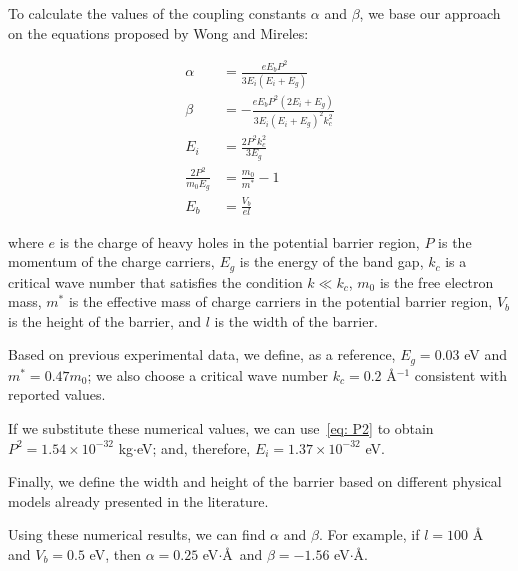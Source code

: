 To calculate the values of the coupling constants $\alpha$ and $\beta$, we base our approach on the equations proposed by Wong and Mireles\cite{WongUNAM2005}:

\begin{align}
    \alpha &= \frac{eE_b P^2}{3E_i\left( E_i + E_g \right)}\label{eq: alfa}\\
    \beta &= -\frac{eE_b P^2\left( 2E_i + E_g \right)}{3E_i\left( E_i + E_g \right)^2 k_c^2}\label{eq: beta}\\
    E_i &= \frac{2P^2 k_c^2}{3E_g} \label{eq: E_i}\\
    \frac{2P^2}{m_0 E_g} &= \frac{m_0}{m^*} - 1 \label{eq: P2}\\
    E_b &= \frac{V_b}{el} \label{eq: E_b}
\end{align}

\noindent where $e$ is the charge of heavy holes in the potential barrier region, $P$ is the momentum of the charge carriers, $E_g$ is the energy of the band gap, $k_c$ is a critical wave number that satisfies the condition $k \ll k_c$, $m_0$ is the free electron mass, $m^*$ is the effective mass of charge carriers in the potential barrier region, $V_b$ is the height of the barrier, and $l$ is the width of the barrier.

Based on previous experimental data\cite{HuntSci2013, FuhrerSci2013, PallaBullMaterSci2016}, we define, as a reference, $E_g = 0.03$ eV and $m^* = 0.47m_0$; we also choose a critical wave number $k_c = 0.2$ \AA$^{-1}$ consistent with reported values.

If we substitute these numerical values, we can use~\eqref{eq: P2} to obtain $P^2=1.54\times10^{-32}$ kg$\cdot$eV; and, therefore, $E_i = 1.37\times10^{-32}$ eV\@.

Finally, we define the width and height of the barrier based on different physical models already presented in the literature.

Using these numerical results, we can find $\alpha$ and $\beta$.
For example, if $l=100$ \AA\, and $V_b = 0.5$ eV, then $\alpha = 0.25$ eV$\cdot$\AA\, and $\beta = -1.56$ eV$\cdot$\AA.


